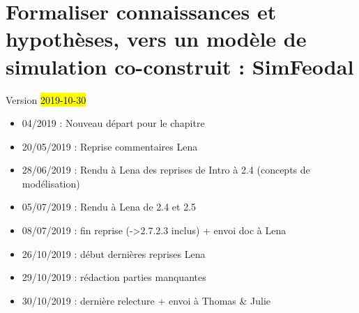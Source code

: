 \setcounter{chapter}{1}
\graphicspath{{chap2/}}

\chapter{Formaliser connaissances et hypothèses, vers un modèle de simulation co-construit : SimFeodal}
\label{chap:chap2}
\begin{center}
	{\large Version \hl{2019-10-30}}
\end{center}

\begin{itemize}
	\item 04/2019 : Nouveau départ pour le chapitre
	\item 20/05/2019 : Reprise commentaires Lena
	\item 28/06/2019 : Rendu à Lena des reprises de Intro à 2.4 (concepts de modélisation)
	\item 05/07/2019 : Rendu à Lena de 2.4 et 2.5
	\item 08/07/2019 : fin reprise (->2.7.2.3 inclus) + envoi doc à Lena
	\item 26/10/2019 : début dernières reprises Lena
	\item 29/10/2019 : rédaction parties manquantes
	\item 30/10/2019 : dernière relecture + envoi à Thomas \& Julie
\end{itemize}
\setcounter{minitocdepth}{1}
\minitoc
\clearpage
{}




